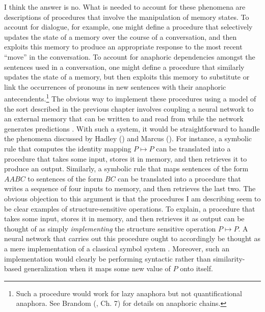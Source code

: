 I think the answer is no. What is needed to account for these phenomena are descriptions of procedures that involve the manipulation of memory states. To account for dialogue, for example, one might define a procedure that selectively updates the state of a memory over the course of a conversation, and then exploits this memory to produce an appropriate response to the most recent ``move'' in the conversation. To account for anaphoric dependencies amongst the sentences used in a conversation, one might define a procedure that similarly updates the state of a memory, but then exploits this memory to substitute or link the occurrences of pronouns in new sentences with their anaphoric antecendents.\footnote{Such a procedure would work for lazy anaphora but not quantificational anaphora. See Brandom (\citeyear{Brandom:1994}, Ch. 7) for details on anaphoric chains.} The obvious way to implement these procedures using a model of the sort described in the previous chapter involves coupling a neural network to an external memory that can be written to and read from while the network generates predictions \citep{Weston:2016,Weston:2015,Sukhbataar:2015,Eliasmith:2012}. With such a system, it would be straightforward to handle the phenomena discussed by Hadley (\citeyear{Hadley:2009}) and Marcus (\citeyear{Marcus:1998}). For instance, a symbolic rule that computes the identity mapping $P \mapsto P$ can be translated into a procedure that takes some input, stores it in memory, and then retrieves it to produce an output. Similarly, a symbolic rule that maps sentences of the form $ AABC $ to sentences of the form $ BC $ can be translated into a procedure that writes a sequence of four inputs to memory, and then retrieves the last two. The obvious objection to this argument is that the procedures I am describing seem to be clear examples of structure-sensitive operations. To explain, a procedure that takes some input, stores it in memory, and then retrieves it as output can be thought of as simply \textit{implementing} the structure sensitive operation $P \mapsto P$. A neural network that carries out this procedure ought to accordingly be thought as a mere implementation of a classical symbol system \citep{FodorPylyshyn:1988}. Moreover, such an implementation would clearly be performing syntactic rather than similarity-based generalization when it maps some new value of $P$ onto itself.

